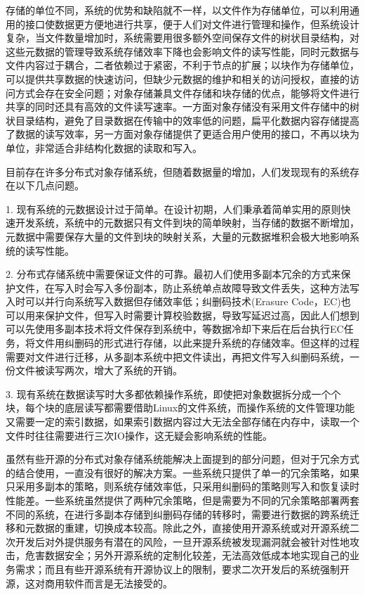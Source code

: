 存储的单位不同，系统的优势和缺陷就不一样，以文件作为存储单位，可以利用通用的接口使数据更方便地进行共享，便于人们对文件进行管理和操作，但系统设计复杂\cite{7}，当文件数量增加时，系统需要用很多额外空间保存文件的树状目录结构，对这些元数据的管理导致系统存储效率下降也会影响文件的读写性能，同时元数据与文件内容过于耦合，二者依赖过于紧密，不利于节点的扩展；以块作为存储单位，可以提供共享数据的快速访问，但缺少元数据的维护和相关的访问授权，直接的访问方式会存在安全问题\cite{8}；对象存储兼具文件存储和块存储的优点，能够将文件进行共享的同时还具有高效的文件读写速率\cite{9}。一方面对象存储没有采用文件存储中的树状目录结构，避免了目录数据在传输中的效率低的问题，扁平化数据内容存储提高了数据的读写效率，另一方面对象存储提供了更适合用户使用的接口，不再以块为单位，非常适合非结构化数据的读取和写入。

目前存在许多分布式对象存储系统，但随着数据量的增加，人们发现现有的系统存在以下几点问题。

1. 现有系统的元数据设计过于简单。在设计初期，人们秉承着简单实用的原则快速开发系统，系统中的元数据只有文件到块的简单映射，当存储的数据不断增加，元数据中需要保存大量的文件到块的映射关系，大量的元数据堆积会极大地影响系统的读写性能。

2. 分布式存储系统中需要保证文件的可靠。最初人们使用多副本冗余的方式来保护文件，在写入时会写入多份副本，防止系统单点故障导致文件丢失，这种方法写入时可以并行向系统写入数据但存储效率低；纠删码技术(Erasure Code，EC)也可以用来保护文件，但写入时需要计算校验数据，导致写延迟过高，因此人们想到可以先使用多副本技术将文件保存到系统中，等数据冷却下来后在后台执行EC任务，将文件用纠删码的形式进行存储，以此来提升系统的存储效率。但这样的过程需要对文件进行迁移，从多副本系统中把文件读出，再把文件写入纠删码系统，一份文件被读写两次，增大了系统的开销。

3. 现有系统在数据读写时大多都依赖操作系统，即使把对象数据拆分成一个个块，每个块的底层读写都需要借助Linux的文件系统，而操作系统的文件管理功能又需要一定的索引数据，如果索引数据内容过大无法全部存储在内存中，读取一个文件时往往需要进行三次IO操作，这无疑会影响系统的性能。

虽然有些开源的分布式对象存储系统能解决上面提到的部分问题，但对于冗余方式的结合使用，一直没有很好的解决方案。一些系统只提供了单一的冗余策略，如果只采用多副本的策略，则系统存储效率低，只采用纠删码的策略则写入和恢复读时性能差。一些系统虽然提供了两种冗余策略，但是需要为不同的冗余策略部署两套不同的系统，在进行多副本存储到纠删码存储的转移时，需要进行数据的跨系统迁移和元数据的重建，切换成本较高。除此之外，直接使用开源系统或对开源系统二次开发后对外提供服务有潜在的风险，一旦开源系统被发现漏洞就会被针对性地攻击，危害数据安全；另外开源系统的定制化较差，无法高效低成本地实现自己的业务需求；而且有些开源系统有开源协议上的限制，要求二次开发后的系统强制开源，这对商用软件而言是无法接受的。

